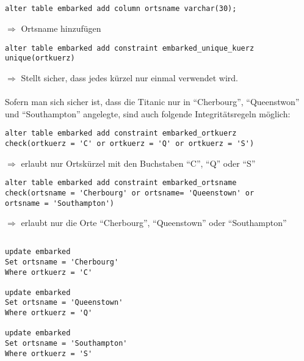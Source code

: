 \documentclass[a4paper,11pt,titlepage]{article}
\begin{document}
\subsection{}
\begin{verbatim}
alter table embarked add column ortsname varchar(30); 
\end{verbatim}
$\Rightarrow$ Ortsname hinzufügen
\begin{verbatim}
alter table embarked add constraint embarked_unique_kuerz unique(ortkuerz) 
\end{verbatim}
$\Rightarrow$ Stellt sicher, dass jedes kürzel nur einmal verwendet wird.\\
\\
Sofern man sich sicher ist, dass die Titanic nur in "`Cherbourg"', "`Queenstwon"' und "`Southampton"' angelegte, sind auch folgende Integritätsregeln möglich:
\begin{verbatim}
alter table embarked add constraint embarked_ortkuerz 
check(ortkuerz = 'C' or ortkuerz = 'Q' or ortkuerz = 'S') 
\end{verbatim}
$\Rightarrow$ erlaubt nur Ortskürzel mit den Buchstaben "`C"', "`Q"' oder "`S"'\\
\begin{verbatim}
alter table embarked add constraint embarked_ortsname 
check(ortsname = 'Cherbourg' or ortsname= 'Queenstown' or 
ortsname = 'Southampton') 
\end{verbatim}
$\Rightarrow$ erlaubt nur die Orte "`Cherbourg"', "`Queenstown"' oder "`Southampton"'
\subsection{}
\begin{verbatim}
update embarked
Set ortsname = 'Cherbourg'
Where ortkuerz = 'C'

update embarked
Set ortsname = 'Queenstown'
Where ortkuerz = 'Q'

update embarked
Set ortsname = 'Southampton'
Where ortkuerz = 'S'
\end{verbatim}
\end{document}
